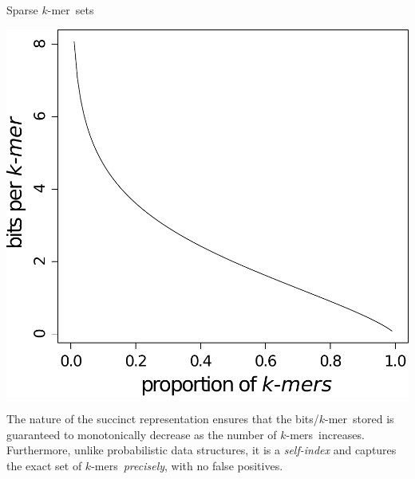 \documentclass[a0paper,portrait]{baposter}
\newcommand{\kmer}{$k$-mer\ }
\newcommand{\kmers}{$k$-mers\ }
\begin{document}
\begin{poster}
\begin{posterbox}[name=kmers,column=2,below=usage]{Sparse \kmer sets}
\begin{center}
\includegraphics[scale=0.32]{bits-per-kmer-theory}
\end{center}


\vspace{-1.0em}

The nature of the succinct representation ensures that the bits/\kmer stored
is guaranteed to monotonically decrease as the number of \kmers increases.
Furthermore, unlike probabilistic data structures, it is a {\em self-index} 
and captures the exact set of \kmers {\em precisely}, with no false positives.
\vspace{-2.5em}


\end{posterbox}
\end{poster}
\end{document}
